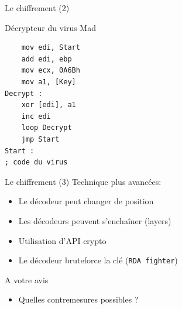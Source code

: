 \documentclass{beamer}
\begin{document}
\begin{frame}[fragile]{Le chiffrement (2)}
\begin{exampleblock}{Décrypteur du virus Mad}
\begin{lstlisting}
	mov edi, Start
	add edi, ebp
	mov ecx, 0A6Bh
	mov a1, [Key]
Decrypt :
	xor [edi], a1
	inc edi
	loop Decrypt
	jmp Start
Start :
; code du virus
\end{lstlisting}
\end{exampleblock}
\end{frame}

\begin{frame}{Le chiffrement (3)}
Technique plus avancées:
\begin{itemize}
\item Le décodeur peut changer de position 
\item Les décodeurs peuvent s'enchaîner (layers)
\item Utilisation d'API crypto
\item Le décodeur bruteforce la clé (\texttt{RDA fighter})
\end{itemize}
\end{frame}

\begin{frame}{A votre avis}
\begin{itemize}
\item \huge{Quelles contremesures possibles ?}
\end{itemize}
\end{frame}
\end{document}
